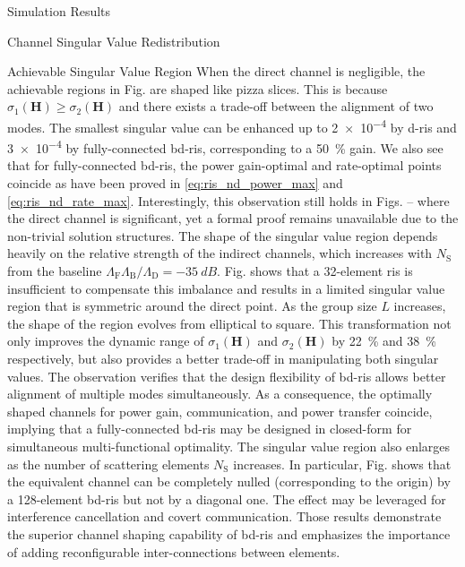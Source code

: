 \documentclass[journal]{IEEEtran}
\begin{document}
\begin{section}{Simulation Results}
\begin{subsection}{Channel Singular Value Redistribution}
\begin{subsubsection}{Achievable Singular Value Region}
			When the direct channel is negligible, the achievable regions in Fig.  are shaped like pizza slices.
			This is because $\sigma_1(\mathbf{H}) \ge \sigma_2(\mathbf{H})$ and there exists a trade-off between the alignment of two modes.
			The smallest singular value can be enhanced up to \num{2e-4} by \gls{d}-\gls{ris} and \num{3e-4} by fully-connected \gls{bd}-\gls{ris}, corresponding to a \qty{50}{\percent} gain.
			We also see that for fully-connected \gls{bd}-\gls{ris}, the power gain-optimal and rate-optimal points coincide as have been proved in  \eqref{eq:ris_nd_power_max} and \eqref{eq:ris_nd_rate_max}.
			Interestingly, this observation still holds in Figs.  --  where the direct channel is significant, yet a formal proof remains unavailable due to the non-trivial solution structures.
			The shape of the singular value region depends heavily on the relative strength of the indirect channels, which increases with $N_\mathrm{S}$ from the baseline $\Lambda_\mathrm{F}\Lambda_\mathrm{B}/\Lambda_\mathrm{D}=\qty{-35}{dB}$.
			Fig.  shows that a 32-element \gls{ris} is insufficient to compensate this imbalance and results in a limited singular value region that is symmetric around the direct point.
			As the group size $L$ increases, the shape of the region evolves from elliptical to square.
			This transformation not only improves the dynamic range of $\sigma_1(\mathbf{H})$ and $\sigma_2(\mathbf{H})$ by \qty{22}{\percent} and \qty{38}{\percent} respectively, but also provides a better trade-off in manipulating both singular values.
			The observation verifies that the design flexibility of \gls{bd}-\gls{ris} allows better alignment of multiple modes simultaneously.
			As a consequence, {the optimally shaped channels for power gain, communication, and power transfer coincide,} implying that {a fully-connected \gls{bd}-\gls{ris} may be designed in closed-form for simultaneous multi-functional optimality.}
			The singular value region also enlarges as the number of scattering elements $N_\mathrm{S}$ increases.
			In particular, Fig.  shows that the equivalent channel can be completely nulled (corresponding to the origin) by a 128-element \gls{bd}-\gls{ris} but not by a diagonal one.
			The effect may be leveraged for interference cancellation and covert communication.
			Those results demonstrate the superior channel shaping capability of \gls{bd}-\gls{ris} and emphasizes the importance of adding reconfigurable inter-connections between elements.
		\end{subsubsection}


\end{subsection}
\end{section}
\end{document}
